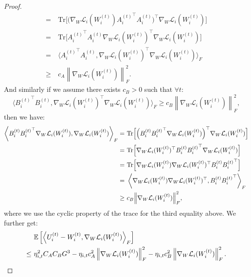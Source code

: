 \begin{proof}
\begin{align*}
= \ &  \text{Tr}\Big[\Big(\nabla_{W}\mathcal{L}_i(W_i^{(t)}){A_i^{(t)}}^{\top}A_i^{(t)}\Big)^{\top}\nabla_{W}\mathcal{L}_i(W_i^{(t)})\Big]\\
= \ &  \text{Tr}\Big[{A_i^{(t)}}^{\top}A_i^{(t)}\nabla_{W}\mathcal{L}_i(W_i^{(t)})^{\top}\nabla_{W}\mathcal{L}_i(W_i^{(t)})\Big]\\
= \ & \Big\langle {A_i^{(t)}}^{\top}A_i^{(t)}, \nabla_{W}\mathcal{L}_i(W_i^{(t)})^{\top}\nabla_{W}\mathcal{L}_i(W_i^{(t)})\Big\rangle_F\\
\geq \ & c_A \left\|\nabla_{W}\mathcal{L}_i(W_i^{(t)})\right\|_F^2.
\end{align*}
And similarly if we assume there exists $c_B > 0$ such that $\forall t$:
\begin{equation*}
\Big\langle {B_i^{(t)}}^{\top}B_i^{(t)}, \nabla_{W}\mathcal{L}_i(W_i^{(t)})^{\top}\nabla_{W}\mathcal{L}_i(W_i^{(t)})\Big\rangle_F
\geq c_B \left\|\nabla_{W}\mathcal{L}_i(W_i^{(t)})\right\|_F^2,
\end{equation*}
then we have:
\begin{align}\label{inner_product_1}
\left\langle B_i^{(t)}{B_i^{(t)}}^{\top}\nabla_{W}\mathcal{L}_i(W_i^{(t)}),\nabla_{W}\mathcal{L}_i(W_i^{(t)})\right\rangle_F \notag
= \ & \text{Tr}\Big[\Big(B_i^{(t)}{B_i^{(t)}}^{\top}\nabla_{W}\mathcal{L}_i(W_i^{(t)})\Big)^{\top}\nabla_{W}\mathcal{L}_i(W_i^{(t)})\Big]\notag\\
= \ & \text{Tr}\Big[\nabla_{W}\mathcal{L}_i(W_i^{(t)})^{\top}B_i^{(t)}{B_i^{(t)}}^{\top}\nabla_{W}\mathcal{L}_i(W_i^{(t)})\Big] \notag\\
= \ & \text{Tr}\Big[\nabla_{W}\mathcal{L}_i(W_i^{(t)})\nabla_{W}\mathcal{L}_i(W_i^{(t)})^{\top}B_i^{(t)}{B_i^{(t)}}^{\top}\Big] \notag\\
= \ & \left\langle \nabla_{W}\mathcal{L}_i(W_i^{(t)})\nabla_{W}\mathcal{L}_i(W_i^{(t)})^{\top}, B_i^{(t)}{B_i^{(t)}}^{\top}\right\rangle_F \notag\\
\geq \ & c_B \Big\|\nabla_{W}\mathcal{L}_i(W_i^{(t)})\Big\|_F^2,
\end{align}
where we use the cyclic property of the trace for the third equality above.
We further get:
\begin{align}\label{inner_product_2}
& \mathbb{E}\left[\left\langle U_i^{(t)}-W_i^{(t)}, \nabla_{W}\mathcal{L}_i(W_i^{(t)})\right\rangle_F\right]\notag\\
\leq \ & \eta_{i,t}^2 C_A C_B G^3 - \eta_{i,t} c_A^2 \left\|\nabla_{W}\mathcal{L}_i(W_i^{(t)})\right\|_F^2 - \eta_{i,t} c_B^2 \left\|\nabla_{W}\mathcal{L}_i(W_i^{(t)})\right\|_F^2.

\end{align}
\end{proof}
